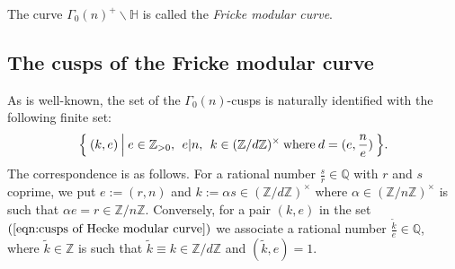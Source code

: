 \documentclass{article}
\theoremstyle{plain}
\theoremstyle{definition}
\theoremstyle{remark}
\newcommand{\Z}{{\mathbb Z}}
\newcommand{\Q}{{\mathbb Q}}
\begin{document}
The curve 
$\Gamma _{0}(n)^{+} \backslash {\mathbb H}$ 
is called 
the {\it Fricke modular curve\/}.

















\subsection{The cusps of the Fricke modular curve}\label{sec5.2}







As is well-known, 
the set of the 
$\Gamma _{0}(n)$-cusps 
is naturally identified with the following finite set: 
\begin{equation}\label{eqn:cusps of Hecke modular curve}
\Bigl\{ 
\Bigl. \: (k, e) \: \Bigr| \: 
e \in {\Z}_{>0},  \: \: 
e | n ,  \: \: 
k \in ({\Z}/d{\Z})^{\times} \: {\rm where\/} \: d=(e, \frac{n}{e}) \: 
\Bigr\} . 
\end{equation}
The correspondence is as follows. 
For a rational number 
$\frac{s}{r} \in {\Q}$ 
with 
$r$ and $s$ coprime, 
we put  
$e:=(r, n)$ 
and 
$k:=\alpha s \in ({\Z}/d{\Z})^{\times}$ 
where 
$\alpha \in ({\Z}/n{\Z})^{\times}$ is such that 
$\alpha e = r \in {\Z}/n{\Z}$. 
Conversely, 
for a pair $(k, e)$ in the set $(\ref{eqn:cusps of Hecke modular curve})$  
we associate a rational number 
$\frac{\tilde{k}}{e} \in {\Q}$, 
where $\tilde{k} \in {\Z}$ is 
such that $\tilde{k} \equiv k \in {\Z}/d{\Z}$ 
and $(\tilde{k}, e)=1$. 
\end{document}
